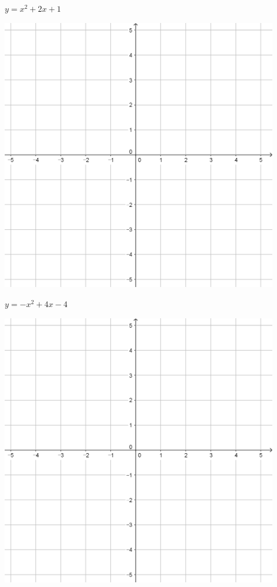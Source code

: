 \documentclass{oblivoir}
\begin{document}
\clearpage
\begin{minipage}{0.45\textwidth}\centering
\(y=x^2+2x+1\)
\par\bigskip\includegraphics[width=0.9\textwidth]{55}
\end{minipage}
\begin{minipage}{0.45\textwidth}\centering
\(y=-x^2+4x-4\)
\par\bigskip\includegraphics[width=0.9\textwidth]{55}
\end{minipage}\bigskip\bigskip\par
\end{document}
